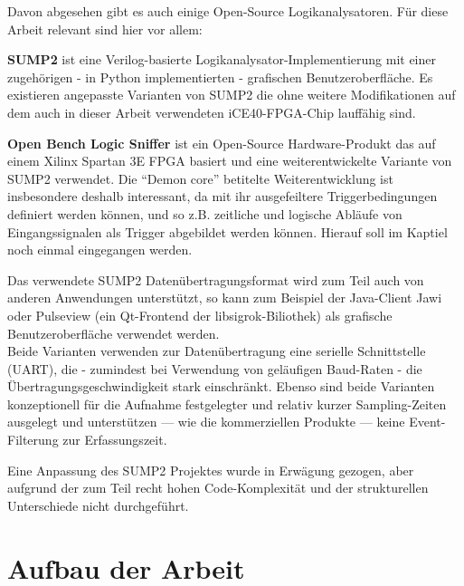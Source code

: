 Davon abgesehen gibt es auch einige Open-Source Logikanalysatoren. Für diese Arbeit relevant sind hier vor allem:
\begin{description}
	\item \textbf{SUMP2} ist eine \gls{Verilog}-basierte Logikanalysator-Implementierung mit einer zugehörigen - in Python implementierten - grafischen Benutzeroberfläche. Es existieren angepasste Varianten von SUMP2 die ohne weitere Modifikationen auf dem auch in dieser Arbeit verwendeten iCE40-FPGA-Chip lauffähig sind\cite{web:blackmesa_sump2}.  
	\item \textbf{Open Bench Logic Sniffer} ist ein Open-Source Hardware-Produkt das auf einem Xilinx Spartan 3E FPGA basiert und eine weiterentwickelte Variante von SUMP2 verwendet. Die ``Demon core'' betitelte Weiterentwicklung ist insbesondere deshalb interessant, da mit ihr ausgefeiltere Triggerbedingungen definiert werden können, und so z.B. zeitliche und logische Abläufe von Eingangssignalen als Trigger abgebildet werden können. Hierauf soll im Kaptiel  noch einmal eingegangen werden.
\end{description}

Das verwendete SUMP2 Datenübertragungsformat wird zum Teil auch von anderen Anwendungen unterstützt, so kann zum Beispiel der Java-Client Jawi\cite{web:ols} oder Pulseview\cite{web:sigrok_ols} (ein Qt-Frontend der libsigrok-Biliothek) als grafische Benutzeroberfläche verwendet werden.\\ 
Beide Varianten verwenden zur Datenübertragung eine serielle Schnittstelle (\acrshort{UART}), die - zumindest bei Verwendung von geläufigen Baud-Raten - die Übertragungsgeschwindigkeit stark einschränkt. Ebenso sind beide Varianten konzeptionell für die Aufnahme festgelegter und relativ kurzer Sampling-Zeiten ausgelegt und unterstützen --- wie die kommerziellen Produkte --- keine Event-Filterung zur Erfassungszeit.  

Eine Anpassung des SUMP2 Projektes wurde in Erwägung gezogen, aber aufgrund der zum Teil recht hohen Code-Komplexität und der strukturellen Unterschiede nicht durchgeführt.


\section{Aufbau der Arbeit}
\label{ch:Einfuehrung:Aufbau}

